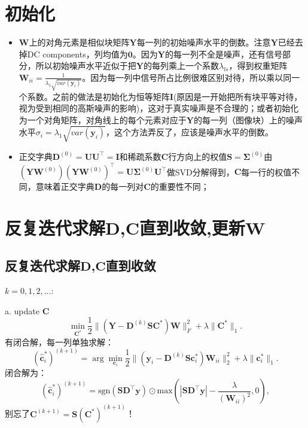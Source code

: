 \documentclass[10pt,twocolumn,letterpaper]{article}
\begin{document}
\section{初始化}
\begin{itemize}
\item $\mathbf{W}$上的对角元素是相似块矩阵$\mathbf{Y}$每一列的初始噪声水平的倒数。注意$\mathbf{Y}$已经去掉DC components，列均值为$\mathbf{0}$。因为$\mathbf{Y}$的每一列不全是噪声，还有信号部分，所以初始噪声水平近似于把$\mathbf{Y}$的每列乘上一个系数$\lambda_{ls}$，得到权重矩阵$\mathbf{W}_{ii}=\frac{1}{\lambda_{1}\sqrt{var(\mathbf{y}_{i})}}$。因为每一列中信号所占比例很难区别对待，所以乘以同一个系数。之前的做法是初始化为恒等矩阵$\mathbf{I}$(原因是一开始把所有块平等对待，视为受到相同的高斯噪声的影响)，这对于真实噪声是不合理的；或者初始化为一个对角矩阵，对角线上的每个元素对应于$\mathbf{Y}$的每一列（图像块）上的噪声水平$\sigma_{i}=\lambda_{1}\sqrt{var(\mathbf{y}_{i})}$，这个方法弄反了，应该是噪声水平的倒数。
\item 正交字典$\mathbf{D}^{(0)}=\mathbf{U}\mathbf{U}^{\top}=\mathbf{I}$和稀疏系数$\mathbf{C}$行方向上的权值$\mathbf{S}=\mathbf{\Sigma}^{(0)}$由$(\mathbf{Y}\mathbf{W}^{(0)})(\mathbf{Y}\mathbf{W}^{(0)})^{\top}=\mathbf{U}\mathbf{\Sigma}^{(0)}\mathbf{U}^{\top}$做SVD分解得到，$\mathbf{C}$每一行的权值不同，意味着正交字典$\mathbf{D}$的每一列对$\mathbf{C}$的重要性不同；
\end{itemize}


\section{反复迭代求解$\mathbf{D}$,$\mathbf{C}$直到收敛,更新$\mathbf{W}$ }
\subsection{反复迭代求解$\mathbf{D}$,$\mathbf{C}$直到收敛}
$k=0,1,2,...$:

a. update $\mathbf{C}$
\begin{equation}
\min_{\mathbf{C}^{*}}\frac{1}{2}\|(\mathbf{Y}-\mathbf{D}^{(k)}\mathbf{S}\mathbf{C}^{*})\mathbf{W}\|_{F}^{2}
+
\lambda\|\mathbf{C}^{*}\|_{1}.
\end{equation}
有闭合解，每一列单独求解：
\begin{equation}
(\hat{\mathbf{c}}_{i}^{*})^{(k+1)}
=
\arg\min_{\mathbf{c}_{i}}\frac{1}{2}\|(\mathbf{y}_{i}-\mathbf{D}^{(k)}\mathbf{S}\mathbf{c}_{i}^{*})\mathbf{W}_{ii}\|_{2}^{2}
+
\lambda\|\mathbf{c}_{i}^{*}\|_{1}.
\end{equation}
闭合解为：
\begin{equation}
(\hat{\mathbf{c}}_{i}^{*})^{(k+1)}
=
\text{sgn}(\mathbf{S}\mathbf{D^{\top}y}) 
\odot 
\text{max}(|\mathbf{S}\mathbf{D^{\top}y}|-\frac{\lambda}{(\mathbf{W}_{ii})^{2}},0),
\end{equation}
别忘了$\mathbf{C}^{(k+1)}=\mathbf{S}(\mathbf{C}^{*})^{(k+1)}$！
\end{document}
